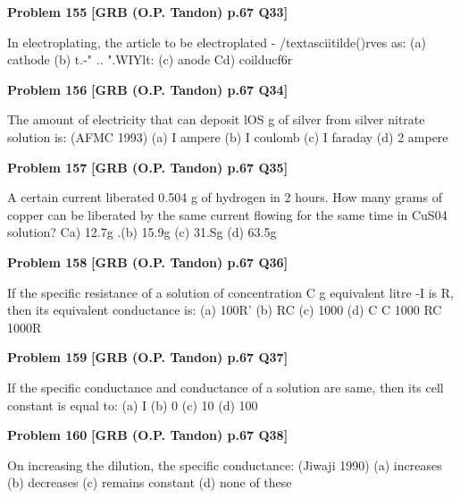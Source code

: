 \begin{problembox}
\textbf{Problem 155} \hfill \textbf{[GRB (O.P. Tandon) p.67 Q33]}
\label{q:ext-grb_all_questions-155}

In electroplating, the article to be electroplated - /textasciitilde()rves as: 
(a) cathode 
(b) t.-" .. ".WIYlt: 
(c) anode 
Cd) coilducf6r
\end{problembox}

\begin{problembox}
\textbf{Problem 156} \hfill \textbf{[GRB (O.P. Tandon) p.67 Q34]}
\label{q:ext-grb_all_questions-156}

The amount of electricity that can deposit lOS g of silver from 
silver nitrate solution is: 
(AFMC 1993) 
(a) I ampere 
(b) I coulomb 
(c) I faraday 
(d) 2 ampere
\end{problembox}

\begin{problembox}
\textbf{Problem 157} \hfill \textbf{[GRB (O.P. Tandon) p.67 Q35]}
\label{q:ext-grb_all_questions-157}

A certain current liberated 0.504 g of hydrogen in 2 hours. 
How many grams of copper can be liberated by the same 
current flowing for the same time in CuS04 solution? 
Ca) 12.7g 
.(b) 15.9g 
(c) 31.Sg 
(d) 63.5g
\end{problembox}

\begin{problembox}
\textbf{Problem 158} \hfill \textbf{[GRB (O.P. Tandon) p.67 Q36]}
\label{q:ext-grb_all_questions-158}

If the specific resistance of a solution of concentration C g 
equivalent litre -I is R, then its equivalent conductance is: 
(a) 100R' 
(b) RC 
(c) 1000 
(d) 
C 
C 
1000 
RC 
1000R
\end{problembox}

\begin{problembox}
\textbf{Problem 159} \hfill \textbf{[GRB (O.P. Tandon) p.67 Q37]}
\label{q:ext-grb_all_questions-159}

If the specific conductance and conductance of a solution are 
same, then its cell constant is equal to: 
(a) I 
(b) 0 
(c) 10 
(d) 100
\end{problembox}

\begin{problembox}
\textbf{Problem 160} \hfill \textbf{[GRB (O.P. Tandon) p.67 Q38]}
\label{q:ext-grb_all_questions-160}

On increasing the dilution, the specific conductance: 
(Jiwaji 1990) 
(a) increases 
(b) decreases 
(c) remains constant 
(d) none of these
\end{problembox}

